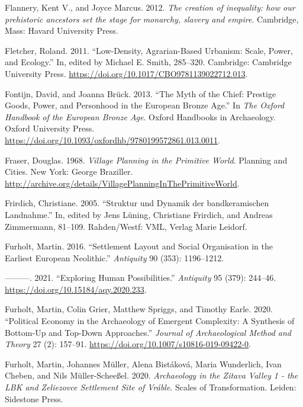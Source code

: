 \documentclass[
  12pt,
  a4paper, twoside]{book}
\newlength{\cslhangindent}
\newlength{\cslentryspacingunit} %
\newenvironment{CSLReferences}[2] %
 {%
  \setlength{\parindent}{0pt}
  \ifodd #1
  \let\oldpar\par
  \def\par{\hangindent=\cslhangindent\oldpar}
  \fi
  \setlength{\parskip}{#2\cslentryspacingunit}
 }%
 {}
\begin{document}
\begin{CSLReferences}{1}{0}
\leavevmode{}%
Flannery, Kent V., and Joyce Marcus. 2012. \emph{The creation of inequality: how our prehistoric ancestors set the stage for monarchy, slavery and empire}. Cambridge, Mass: Havard University Press.

\leavevmode{}%
Fletcher, Roland. 2011. {``Low-Density, Agrarian-Based Urbanism: Scale, Power, and Ecology.''} In, edited by Michael E. Smith, 285--320. Cambridge: Cambridge University Press. \url{https://doi.org/10.1017/CBO9781139022712.013}.

\leavevmode{}%
Fontijn, David, and Joanna Brück. 2013. {``The {Myth} of the {Chief}: {Prestige Goods}, {Power}, and {Personhood} in the {European Bronze Age}.''} In \emph{The {Oxford Handbook} of the {European Bronze Age}}. Oxford {Handbooks} in {Archaeology}. {Oxford University Press}. \url{https://doi.org/10.1093/oxfordhb/9780199572861.013.0011}.

\leavevmode{}%
Fraser, Douglas. 1968. \emph{Village Planning in the Primitive World}. Planning and Cities. New York: George Braziller. \url{http://archive.org/details/VillagePlanningInThePrimitiveWorld}.

\leavevmode{}%
Frirdich, Christiane. 2005. {``Struktur und Dynamik der bandkeramischen Landnahme.''} In, edited by Jens Lüning, Christiane Frirdich, and Andreas Zimmermann, 81--109. Rahden/Westf: VML, Verlag Marie Leidorf.

\leavevmode{}%
Furholt, Martin. 2016. {``Settlement Layout and Social Organisation in the Earliest European Neolithic.''} \emph{Antiquity} 90 (353): 1196--1212.

\leavevmode{}%
---------. 2021. {``Exploring Human Possibilities.''} \emph{Antiquity} 95 (379): 244--46. \url{https://doi.org/10.15184/aqy.2020.233}.

\leavevmode{}%
Furholt, Martin, Colin Grier, Matthew Spriggs, and Timothy Earle. 2020. {``Political Economy in the Archaeology of Emergent Complexity: A Synthesis of Bottom-Up and Top-Down Approaches.''} \emph{Journal of Archaeological Method and Theory} 27 (2): 157--91. \url{https://doi.org/10.1007/s10816-019-09422-0}.

\leavevmode{}%
Furholt, Martin, Johannes Müller, Alena Bistáková, Maria Wunderlich, Ivan Cheben, and Nils Müller-Scheeßel. 2020. \emph{Archaeology in the Zitava Valley 1 - the LBK and Zeliezovce Settlement Site of Vráble}. Scales of Transformation. Leiden: Sidestone Press.


\end{CSLReferences}
\end{document}
